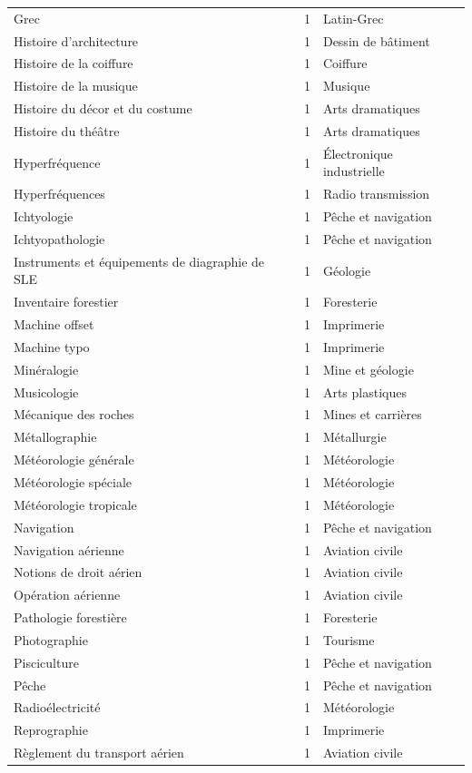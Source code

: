 \documentclass[11pt,a4paper]{article}
\begin{document}
\begin{longtable}{@{}>{\raggedright\arraybackslash}p{5cm}c>{\raggedright\arraybackslash}p{8.4cm}@{}}
Grec & 1 & Latin-Grec\\
Histoire d'architecture & 1 & Dessin de bâtiment\\
Histoire de la coiffure & 1 & Coiffure\\
Histoire de la musique & 1 & Musique\\
Histoire du décor et du costume & 1 & Arts dramatiques\\
Histoire du théâtre & 1 & Arts dramatiques\\
Hyperfréquence & 1 & Électronique industrielle\\
Hyperfréquences & 1 & Radio transmission\\
Ichtyologie & 1 & Pêche et navigation\\
Ichtyopathologie & 1 & Pêche et navigation\\
Instruments et équipements de diagraphie de SLE & 1 & Géologie\\
Inventaire forestier & 1 & Foresterie\\
Machine offset & 1 & Imprimerie\\
Machine typo & 1 & Imprimerie\\
Minéralogie & 1 & Mine et géologie\\
Musicologie & 1 & Arts plastiques\\
Mécanique des roches & 1 & Mines et carrières\\
Métallographie & 1 & Métallurgie\\
Météorologie générale & 1 & Météorologie\\
Météorologie spéciale & 1 & Météorologie\\
Météorologie tropicale & 1 & Météorologie\\
Navigation & 1 & Pêche et navigation\\
Navigation aérienne & 1 & Aviation civile\\
Notions de droit aérien & 1 & Aviation civile\\
Opération aérienne & 1 & Aviation civile\\
Pathologie forestière & 1 & Foresterie\\
Photographie & 1 & Tourisme\\
Pisciculture & 1 & Pêche et navigation\\
Pêche & 1 & Pêche et navigation\\
Radioélectricité & 1 & Météorologie\\
Reprographie & 1 & Imprimerie\\
Règlement du transport aérien & 1 & Aviation civile\\

\end{longtable}
\end{document}
